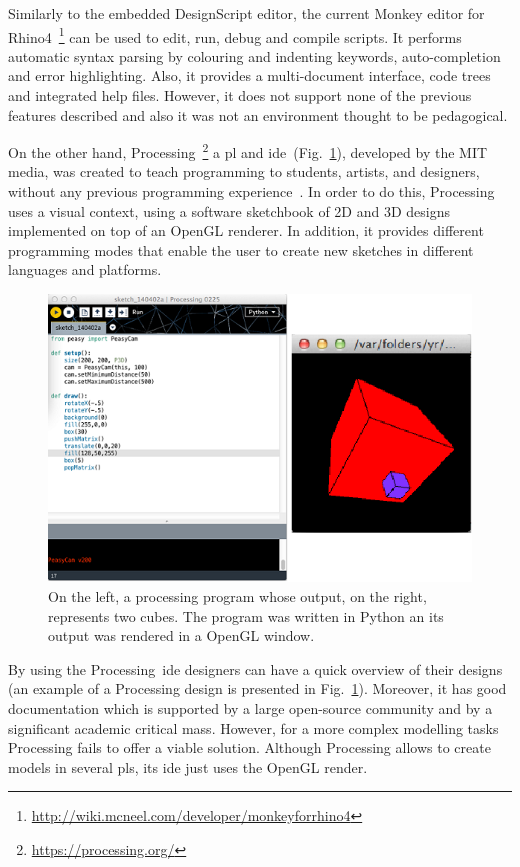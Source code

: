 Similarly to the embedded DesignScript editor, the current Monkey editor for Rhino4~\footnote{\url{http://wiki.mcneel.com/developer/monkeyforrhino4}} can be used to edit, run, debug and compile scripts. It performs automatic syntax parsing by colouring and indenting keywords, auto-completion and error highlighting. Also, it provides a multi-document interface, code trees and integrated help files. However, it does not support none of the previous features described and also it was not an environment thought to be pedagogical.

On the other hand, Processing~\footnote{\url{https://processing.org/}} a \ac{pl} and \ac{ide}~(Fig.~\ref{fig:pross}), developed by the {\small MIT} media,  was created to teach programming to students, artists, and designers, without any previous programming experience~\cite{reas2006processing}. In order to do this, Processing uses a visual context, using
a software sketchbook of 2D and 3D designs implemented on top of an OpenGL renderer. In addition, it provides different programming modes that enable the user to create new sketches in different languages and platforms.

\begin{figure}[h]
  \centering
  \includegraphics[scale=0.4]{img/processing}
    \caption{On the left, a processing program whose output, on the right, represents two cubes. The program was written in Python an its output was rendered in a OpenGL window.}
  \label{fig:pross}
\end{figure}

By using the Processing~\ac{ide} designers can have a quick overview of their designs (an example of a Processing design is presented in Fig.~\ref{fig:pross}). Moreover, it has good documentation which is supported by a large open-source community and by a significant academic critical mass. However, for a more complex modelling tasks Processing fails to offer a viable solution. Although Processing allows to create models in several \ac{pl}s, its \ac{ide} just uses the OpenGL render.   

